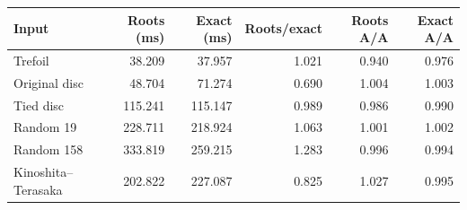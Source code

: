 \begin{tabular}{lrrrrr}
\toprule
Input & Roots (ms) & Exact (ms) & Roots/exact & Roots A/A & Exact A/A \\
\midrule
Trefoil & 38.209 & 37.957 & 1.021 & 0.940 & 0.976 \\
Original disc & 48.704 & 71.274 & 0.690 & 1.004 & 1.003 \\
Tied disc & 115.241 & 115.147 & 0.989 & 0.986 & 0.990 \\
Random 19 & 228.711 & 218.924 & 1.063 & 1.001 & 1.002 \\
Random 158 & 333.819 & 259.215 & 1.283 & 0.996 & 0.994 \\
Kinoshita--Terasaka & 202.822 & 227.087 & 0.825 & 1.027 & 0.995 \\
\bottomrule
\end{tabular}
